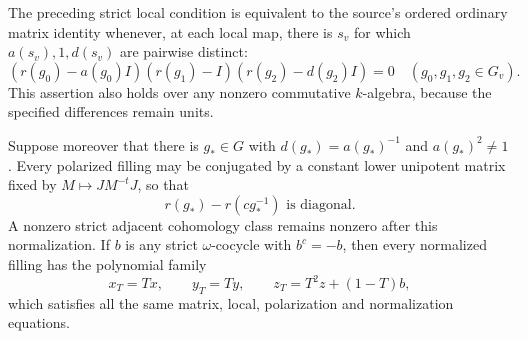 \begin{proposition}
\label{AC-G90-Low}
The preceding strict local condition is equivalent to the source's
ordered ordinary matrix identity whenever, at each local map, there
is \(s_v\) for which \(a(s_v),1,d(s_v)\) are pairwise distinct:
\[
 (r(g_0)-a(g_0)I)(r(g_1)-I)(r(g_2)-d(g_2)I)=0
 \quad(g_0,g_1,g_2\in G_v).
 \tag{G90.18}
\]
This assertion also holds over any nonzero commutative \(k\)-algebra,
because the specified differences remain units.

Suppose moreover that there is \(g_\ast\in G\) with
\(d(g_\ast)=a(g_\ast)^{-1}\) and \(a(g_\ast)^2\ne1\).
Every polarized filling may be conjugated by a constant lower
unipotent matrix fixed by \(M\mapsto JM^{-t}J\), so that
\[
 r(g_\ast)-r(cg_\ast^{-1})\text{ is diagonal}.
 \tag{G90.19}
\]
A nonzero strict adjacent cohomology class remains nonzero after this
normalization.  If \(b\) is any strict \(\omega\)-cocycle with
\(b^c=-b\), then every normalized filling has the polynomial family
\[
 x_T=T x,\qquad y_T=T y,\qquad
 z_T=T^2z+(1-T)b,
 \tag{G90.20}
\]
which satisfies all the same matrix, local, polarization and
normalization equations.
\end{proposition}


